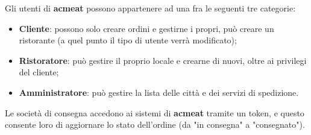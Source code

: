 \documentclass[11pt]{article} %
\begin{document}
Gli utenti di \textbf{acmeat} possono appartenere ad una fra le seguenti tre categorie:
\begin{itemize}
\item \textbf{Cliente}: possono solo creare ordini e gestirne i propri, può creare un ristorante (a quel punto il tipo di utente verrà modificato);
\item \textbf{Ristoratore}: può gestire il proprio locale e crearne di nuovi, oltre ai privilegi del cliente;
\item \textbf{Amministratore}: può gestire la lista delle città e dei servizi di spedizione.
\end{itemize}
Le società di consegna accedono ai sistemi di \textbf{acmeat} tramite un token, e questo consente loro di aggiornare lo stato dell'ordine (da "in consegna" a "consegnato").
\end{document}

